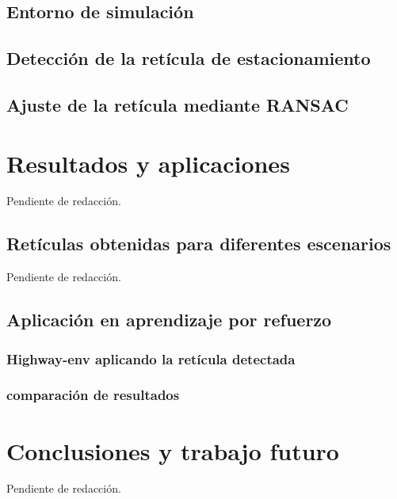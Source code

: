 \documentclass[10pt,letterpaper,final]{article}
\begin{document}
\subsection{Entorno de simulación}\label{sec:carla}


\subsection{Detección de la retícula de estacionamiento}\label{sec:metodo-reticula}


\subsection{Ajuste de la retícula mediante RANSAC}\label{sec:metodo-ransac}


\clearpage
\section{Resultados y aplicaciones}
Pendiente de redacción.
\subsection{Retículas obtenidas para diferentes escenarios}
Pendiente de redacción.

\subsection{Aplicación en aprendizaje por refuerzo}


\subsubsection{Highway-env aplicando la retícula detectada}


\subsubsection{comparación de resultados}

\clearpage
\section{Conclusiones y trabajo futuro}
Pendiente de redacción.

\clearpage


\end{document}
